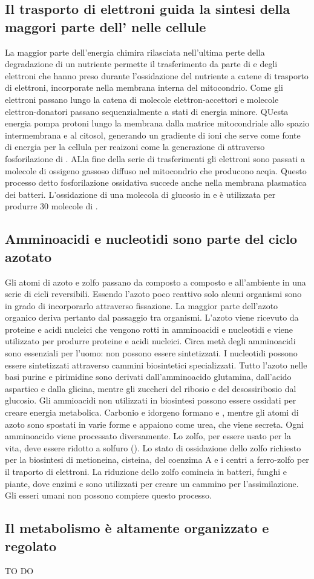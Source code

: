 \subsection{Il trasporto di elettroni guida la sintesi della maggori parte dell' nelle cellule}
La maggior parte dell'energia chimira rilasciata nell'ultima perte della degradazione di un nutriente permette il trasferimento da parte di  e  degli elettroni che
hanno preso durante l'ossidazione del nutriente a catene di trasporto di elettroni, incorporate nella membrana interna del mitocondrio. Come gli elettroni passano lungo la catena di
molecole elettron-accettori e molecole elettron-donatori passano sequenzialmente a stati di energia minore. QUesta energia pompa protoni  lungo la membrana dalla matrice 
mitocondriale allo spazio intermembrana e al citosol, generando un gradiente di ioni  che serve come fonte di energia per la cellula per reaizoni come la generazione di 
attraverso fosforilazione di . ALla fine della serie di trasferimenti gli elettroni sono passati a molecole di ossigeno gassoso diffuso nel mitocondrio che producono acqia. 
Questo processo detto fosforilazione ossidativa succede anche nella membrana plasmatica dei batteri. L'ossidazione di una molecola di glucosio in  e  \`e utilizzata per
produrre $30$ molecole di .
\subsection{Amminoacidi e nucleotidi sono parte del ciclo azotato}
Gli atomi di azoto e zolfo passano da composto a composto e all'ambiente in una serie di cicli reversibili. Essendo l'azoto poco reattivo solo alcuni organismi sono in grado di 
incorporarlo attraverso fissazione. La maggior parte dell'azoto organico deriva pertanto dal passaggio tra organismi. L'azoto viene ricevuto da proteine e acidi nucleici che vengono
rotti in amminoacidi e nucleotidi e viene utilizzato per produrre proteine e acidi nucleici. Circa met\`a degli amminoacidi sono essenziali per l'uomo: non possono essere sintetizzati. 
I nucleotidi possono essere sintetizzati attraverso cammini biosintetici specializzati. Tutto l'azoto nelle basi purine e pirimidine sono derivati dall'amminoacido glutamina, dall'acido
aspartico e dalla glicina, mentre gli zuccheri del ribosio e del desossiribosio dal glucosio. Gli ammioacidi non utilizzati in biosintesi possono essere ossidati per creare energia
metabolica. Carbonio e idorgeno formano  e , mentre gli atomi di azoto sono spostati in varie forme e appaiono come urea, che viene secreta. Ogni amminoacido viene
processato diversamente. Lo zolfo, per essere usato per la vita, deve essere ridotto a solfuro (). Lo stato di ossidazione dello zolfo richiesto per la biosintesi di 
metioneina, cisteina, del coenzima A e i centri a ferro-zolfo per il traporto di elettroni. La riduzione dello zolfo comincia in batteri, funghi e piante, dove enzimi e  sono 
utilizzati per creare un cammino per l'assimilazione. Gli esseri umani non possono compiere questo processo.
\subsection{Il metabolismo \`e altamente organizzato e regolato}





\begin{Huge}
	TO DO
\end{Huge}

